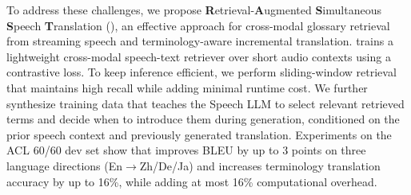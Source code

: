 To address these challenges, we propose \textbf{R}etrieval-\textbf{A}ugmented \textbf{S}imultaneous \textbf{S}peech \textbf{T}ranslation (\method), an effective approach for cross-modal glossary retrieval from streaming speech and terminology-aware incremental translation. \method trains a lightweight cross-modal speech-text retriever over short audio contexts using a contrastive loss. To keep inference efficient, we perform sliding-window retrieval that maintains high recall while adding minimal runtime cost. We further synthesize training data that teaches the Speech LLM to select relevant retrieved terms and decide when to introduce them during generation, conditioned on the prior speech context and previously generated translation. Experiments on the ACL 60/60 dev set show that \method improves BLEU by up to 3 points on three language directions (En$\rightarrow$Zh/De/Ja) and increases terminology translation accuracy by up to 16\%, while adding at most 16\% computational overhead.

